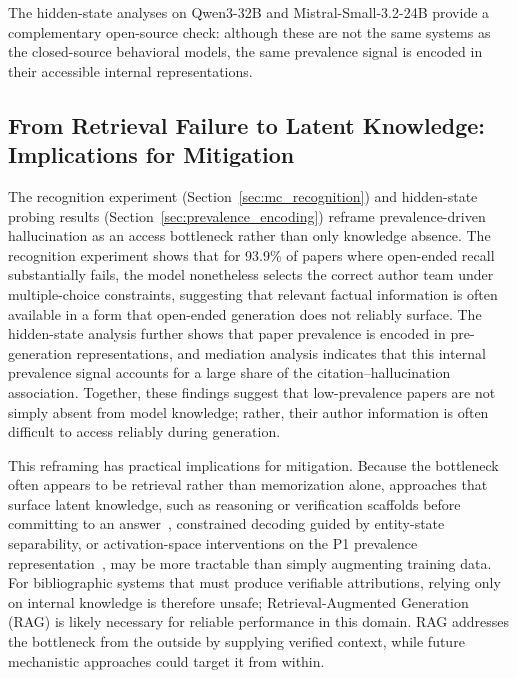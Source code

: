 \documentclass[11pt]{article}
\begin{document}
The hidden-state analyses on Qwen3-32B and Mistral-Small-3.2-24B provide a complementary open-source check: although these are not the same systems as the closed-source behavioral models, the same prevalence signal is encoded in their accessible internal representations.

\subsection{From Retrieval Failure to Latent Knowledge: Implications for Mitigation}

The recognition experiment (Section~\ref{sec:mc_recognition}) and hidden-state
probing results (Section~\ref{sec:prevalence_encoding}) reframe
prevalence-driven hallucination as an access bottleneck rather than only knowledge absence. The recognition experiment shows that for 93.9\% of papers where
open-ended recall substantially fails, the model nonetheless selects the correct
author team under multiple-choice constraints, suggesting that relevant factual
information is often available in a form that open-ended generation does not
reliably surface. The hidden-state analysis further shows that paper prevalence
is encoded in pre-generation representations, and mediation analysis indicates that this internal prevalence signal accounts for a large share of the
citation--hallucination association. Together, these findings suggest that low-prevalence papers are not simply absent from model knowledge; rather, their author information is often difficult to access reliably during generation.

This reframing has practical implications for mitigation. Because the bottleneck
often appears to be retrieval rather than memorization alone, approaches that
surface latent knowledge, such as reasoning or verification scaffolds before
committing to an answer~\citep{wei2022chain}, constrained decoding guided by
entity-state separability, or activation-space interventions on the P1 prevalence
representation~\citep{li2023inference, zou2023representation}, may be more
tractable than simply augmenting training data. For bibliographic systems that must produce verifiable attributions,
relying only on internal knowledge is therefore unsafe;
Retrieval-Augmented Generation (RAG) is likely necessary for reliable
performance in this domain. RAG addresses the bottleneck from the outside by
supplying verified context, while future mechanistic approaches could target it
from within.
\end{document}
